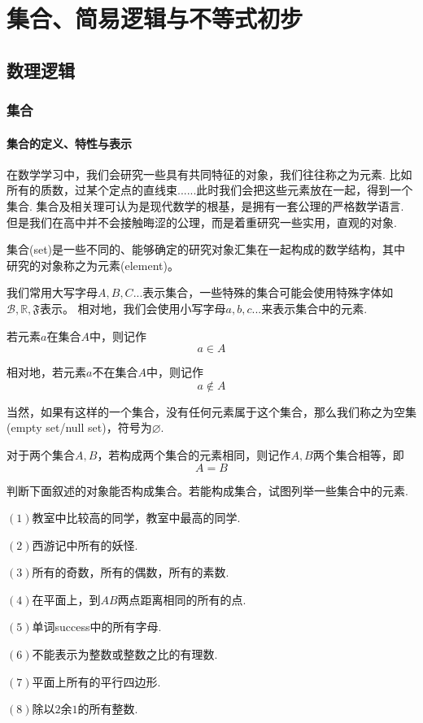 \part{集合、简易逻辑与不等式初步}
\chapter{数理逻辑}
\section{集合}
\subsection{集合的定义、特性与表示}
在数学学习中，我们会研究一些具有共同特征的对象，我们往往称之为元素.
比如所有的质数，过某个定点的直线束......此时我们会把这些元素放在一起，得到一个集合.
集合及相关理可认为是现代数学的根基，是拥有一套公理的严格数学语言.
但是我们在高中并不会接触晦涩的公理，而是着重研究一些实用，直观的对象.
\begin{definition}\label{ref:集合}
    集合(set)是一些不同的、能够确定的研究对象汇集在一起构成的数学结构，其中研究的对象称之为元素(element)。
\end{definition}

我们常用大写字母$A,B,C...$表示集合，一些特殊的集合可能会使用特殊字体如$\mathcal{B},\mathbb{R},\mathfrak{F} $表示。
相对地，我们会使用小写字母$a,b,c...$来表示集合中的元素.

若元素$a$在集合$A$中，则记作\[a \in A\]

相对地，若元素$a$不在集合$A$中，则记作\[a \notin A\]

当然，如果有这样的一个集合，没有任何元素属于这个集合，那么我们称之为空集(empty set/null set)，符号为$\varnothing $.

对于两个集合$A,B$，若构成两个集合的元素相同，则记作$A,B$两个集合相等，即\[A=B\]
\begin{example}
    判断下面叙述的对象能否构成集合。若能构成集合，试图列举一些集合中的元素.
    
    $(1)$教室中比较高的同学，教室中最高的同学.

    $(2)$西游记中所有的妖怪.

    $(3)$所有的奇数，所有的偶数，所有的素数.

    $(4)$在平面上，到$A$$B$两点距离相同的所有的点.

    $(5)$单词success中的所有字母.

    $(6)$不能表示为整数或整数之比的有理数.

    $(7)$平面上所有的平行四边形.

    $(8)$除以$2$余$1$的所有整数.
\end{example}

